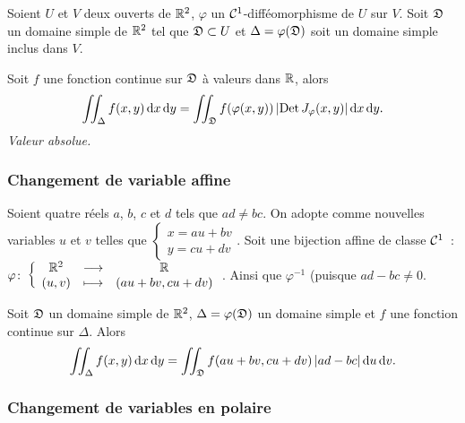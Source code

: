 \begin{theo}
  Soient \(U\) et \(V\) deux ouverts de \(\mathbb{R}^2\), \(\varphi\) un 
  \(\mathcal{C}^{1}\)-difféomorphisme de \(U\) sur \(V\). Soit \(\mathfrak{D}\) un 
  domaine simple de \(\mathbb{R}^2\) tel que \(\mathfrak{D} \subset U\) et \(\Delta = 
  \varphi(\mathfrak{D})\) soit un domaine simple inclus dans \(V\).

  Soit \(f\) une fonction continue sur \(\mathfrak{D}\) à valeurs dans \(\mathbb{R}\), 
  alors
  \begin{equation}
    \iint_\Delta f(x,y)\mathop{}\mathopen{}\mathrm{d} x \mathop{}\mathopen{}\mathrm{d} y = \iint_{\mathfrak{D}} f(\varphi(x,y)) 
    \left\lvert\operatorname{Det} J_\varphi(x,y)\right\rvert\mathop{}\mathopen{}\mathrm{d} x \mathop{}\mathopen{}\mathrm{d} y.
  \end{equation}
  \emph{Valeur absolue.}
\end{theo}

\subsubsection{Changement de variable affine}

\begin{theo}
  Soient quatre réels \(a\), \(b\), \(c\) et \(d\) tels que \(ad \neq bc\). On 
  adopte comme nouvelles variables \(u\) et \(v\) telles que \(\begin{cases} 
  x=au+bv \\ y=cu+dv \end{cases}\). Soit une bijection affine de classe 
  \(\mathcal{C}^{1}\)~: \(\varphi\colon\left\{\begin{array}{ccc}\mathbb{R}^2 & \longrightarrow &\mathbb{R}\\(u,v) & \longmapsto & (au+bv, cu+dv)\end{array}\right.\). 
  Ainsi que \(\varphi^{-1}\) (puisque \(ad-bc\neq 0\).

  Soit \(\mathfrak{D}\) un domaine simple de \(\mathbb{R}^2\), 
  \(\Delta=\varphi(\mathfrak{D})\) un domaine simple et \(f\) une fonction continue 
  sur \(\Delta\). Alors
  \begin{equation}
    \iint_\Delta f(x,y)\mathop{}\mathopen{}\mathrm{d} x \mathop{}\mathopen{}\mathrm{d} y = \iint_{\mathfrak{D}} f(au+bv, cu+dv) 
    \left\lvert ad-bc\right\rvert\mathop{}\mathopen{}\mathrm{d} u \mathop{}\mathopen{}\mathrm{d} v.
  \end{equation}
\end{theo}

\subsubsection{Changement de variables en polaire}

